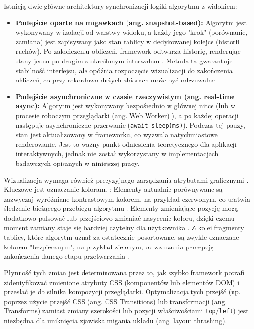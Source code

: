 \documentclass[12pt,openright,twoside]{report}
\begin{document}
Istnieją dwie główne architektury synchronizacji logiki algorytmu z widokiem:
\begin{itemize}
    \item \textbf{Podejście oparte na migawkach (ang. snapshot-based):} Algorytm jest wykonywany w izolacji od warstwy widoku, a każdy jego "krok" (porównanie, zamiana) jest zapisywany jako stan tablicy w dedykowanej kolejce (historii ruchów). Po zakończeniu obliczeń, framework odtwarza historię, renderując stany jeden po drugim z określonym interwałem \cite{Browser_Architecture}. Metoda ta gwarantuje stabilność interfejsu, ale opóźnia rozpoczęcie wizualizacji do zakończenia obliczeń, co przy rekordowo dużych zbiorach może być odczuwalne.
  \item \textbf{Podejście asynchroniczne w czasie rzeczywistym (ang. real-time async):} Algorytm jest wykonywany bezpośrednio w głównej nitce (lub w procesie roboczym przeglądarki (ang. Web Worker) \cite{MDN_Web_Workers}), a po każdej operacji następuje asynchroniczne przerwanie (\texttt{await sleep(ms)}). Podczas tej pauzy, stan jest aktualizowany w frameworku, co wyzwala natychmiastowe renderowanie. Jest to ważny punkt odniesienia teoretycznego dla aplikacji interaktywnych, jednak nie został wykorzystany w implementacjach badawczych opisanych w niniejszej pracy.
\end{itemize}

Wizualizacja wymaga również precyzyjnego zarządzania atrybutami graficznymi \cite{Refactoring_UI}. Kluczowe jest oznaczanie kolorami \cite{Nielsen_Usability}:
Elementy aktualnie porównywane są zazwyczaj wyróżniane kontrastowym kolorem, na przykład czerwonym, co ułatwia śledzenie bieżącego przebiegu algorytmu \cite{Refactoring_UI}. Elementy zmieniające pozycję mogą dodatkowo pulsować lub przejściowo zmieniać nasycenie koloru, dzięki czemu moment zamiany staje się bardziej czytelny dla użytkownika \cite{Refactoring_UI}. Z kolei fragmenty tablicy, które algorytm uznał za ostatecznie posortowane, są zwykle oznaczane kolorem "bezpiecznym", na przykład zielonym, co wzmacnia percepcję zakończenia danego etapu przetwarzania \cite{Refactoring_UI}.

Płynność tych zmian jest determinowana przez to, jak szybko framework potrafi zidentyfikować zmienione atrybuty CSS (komponentów lub elementów DOM) i przesłać je do silnika kompozycji przeglądarki. Optymalizacja tych przejść (np. poprzez użycie przejść CSS (ang. CSS Transitions) lub transformacji (ang. Transforms) zamiast zmiany szerokości lub pozycji właściwościami \texttt{top}/\texttt{left}) jest niezbędna dla uniknięcia zjawiska migania układu (ang. layout thrashing).
\end{document}
